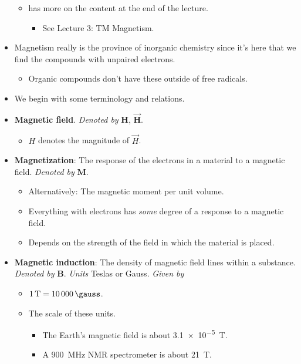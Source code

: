 \documentclass[../notes.tex]{subfiles}
\begin{document}
\begin{itemize}
\begin{itemize}
\begin{itemize}
        \end{itemize}
        \item \textcite{bib:CHEM20200Notes} has more on the content at the end of the lecture.
        \begin{itemize}
            \item See Lecture 3: TM Magnetism.
        \end{itemize}
    \end{itemize}
    \item Magnetism really is the province of inorganic chemistry since it's here that we find the compounds with unpaired electrons.
    \begin{itemize}
        \item Organic compounds don't have these outside of free radicals.
    \end{itemize}
    \item We begin with some terminology and relations.
    \item \textbf{Magnetic field}. \emph{Denoted by} $\bm{H}$, $\bm{\vec{H}}$.
    \begin{itemize}
        \item $H$ denotes the magnitude of $\vec{H}$.
    \end{itemize}
    \item \textbf{Magnetization}: The response of the electrons in a material to a magnetic field. \emph{Denoted by} $\bm{M}$.
    \begin{itemize}
        \item Alternatively: The magnetic moment per unit volume.
        \item Everything with electrons has \emph{some} degree of a response to a magnetic field.
        \item Depends on the strength of the field in which the material is placed.
    \end{itemize}
    \item \textbf{Magnetic induction}: The density of magnetic field lines within a substance. \emph{Denoted by} $\bm{B}$. \emph{Units} Teslas or Gauss. \emph{Given by}
    \begin{itemize}
        \item $\SI{1}{\tesla}=\SI{10000}{\gauss}$.
        \item The scale of these units.
        \begin{itemize}
            \item The Earth's magnetic field is about \SI{3.1e-5}{\tesla}.
            \item A \SI{900}{\mega\hertz} NMR spectrometer is about \SI{21}{\tesla}.

\end{itemize}
\end{itemize}
\end{itemize}
\end{document}
